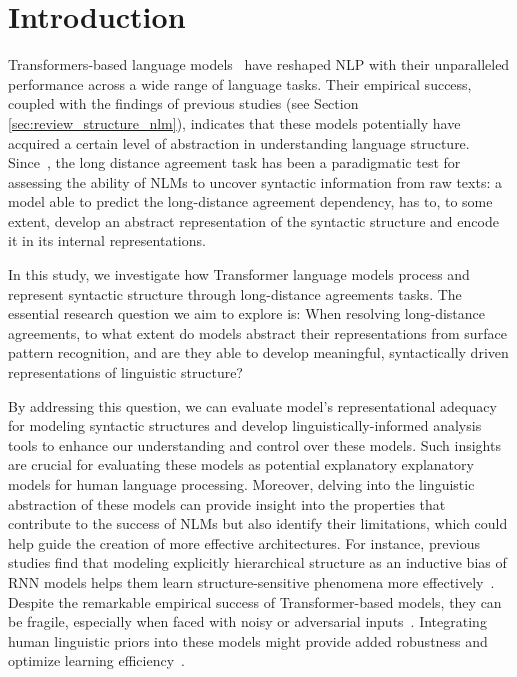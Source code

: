 \section{Introduction} \label{sec:intro_main_project}

Transformers-based language models~\citep{NIPS2017_3f5ee243,devlin-etal-2019-bert,brown2020language} have reshaped NLP with their unparalleled performance across a wide range of language tasks. Their empirical success, coupled with the findings of previous studies (see Section \ref{sec:review_structure_nlm}), indicates that these models potentially have acquired a certain level of abstraction in understanding language structure. Since~\cite{linzen-etal-2016-assessing}, the long distance agreement task has been a paradigmatic test for assessing the ability of NLMs to uncover syntactic information from raw texts: a model able to predict the long-distance agreement dependency, has to, to some extent, develop an abstract representation of the syntactic structure and encode it in its internal representations.   

In this study, we investigate how Transformer language models process and represent syntactic structure through long-distance agreements tasks. The essential research question we aim to explore is: When resolving long-distance agreements, to what extent do models abstract their representations from surface pattern recognition, and are they able to develop meaningful, syntactically driven representations of linguistic structure? 

By addressing this question, we can evaluate model's representational adequacy for modeling syntactic structures and develop linguistically-informed analysis tools to enhance our understanding and control over these models. Such insights are crucial for evaluating these models as potential explanatory explanatory models for human language processing. Moreover, delving into the linguistic abstraction of these models can provide insight into the properties that contribute to the success of NLMs but also identify their limitations, which could help guide the creation of more effective architectures. For instance, previous studies find that modeling explicitly hierarchical structure as an inductive bias of RNN models helps them learn structure-sensitive phenomena more effectively~\citep{kuncoro-etal-2018-lstms,wilcox-etal-2019-structural}. Despite the remarkable empirical success of Transformer-based models, they can be fragile, especially when faced with noisy or adversarial inputs~\citep{wang2022bert}. Integrating human linguistic priors into these models might provide added robustness and optimize learning efficiency~\citep{lake2017building,besold2017neuralsymbolic}.


